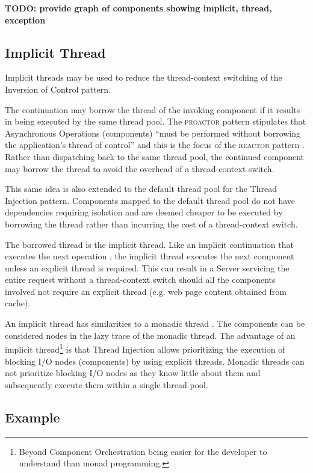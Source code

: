 \documentclass[prodmode]{style/acmlarge}
\begin{document}
\textbf{TODO: provide graph of components showing implicit, thread, exception}


\subsection{Implicit Thread}

Implicit threads may be used to reduce the thread-context switching of the
Inversion of Control pattern.

The continuation may borrow the thread of the invoking component if it results
in being executed by the same thread pool.  The \textsc{proactor} pattern
stipulates that Asynchronous Operations (components) ``must be performed without
borrowing the application's thread of control'' \cite[p. 8]{proactor} and this
is the focus of the \textsc{reactor} pattern \cite{reactor}.  Rather than
dispatching back to the same thread pool, the continued component may borrow the
thread to avoid the overhead of a thread-context switch.

This same idea is also extended to the default thread pool for the Thread
Injection pattern.  Components mapped to the default thread pool do
not have dependencies requiring isolation and are deemed cheaper to be executed
by borrowing the thread rather than incurring the cost of a thread-context
switch.

The borrowed thread is the implicit thread.  Like an implicit continuation that
executes the next operation \cite{continuations}, the implicit thread executes
the next component unless an explicit thread is required.  This can result in
a Server servicing the entire request without a thread-context switch
should all the components involved not require an explicit thread
(e.g. web page content obtained from cache).

An implicit thread has similarities to a monadic thread \cite{monadic-thread}.
The components can be considered nodes in the lazy trace of the monadic thread. 
The advantage of an implicit thread\footnote{Beyond Component Orchestration
being easier for the developer to understand than monad programming.} is that
Thread Injection allows prioritizing the execution of blocking I/O nodes
(components) by using explicit threads.  Monadic threads can not prioritize
blocking I/O nodes as they know little about them and subsequently execute them
within a single thread pool.


\subsection{Example}
\end{document}

